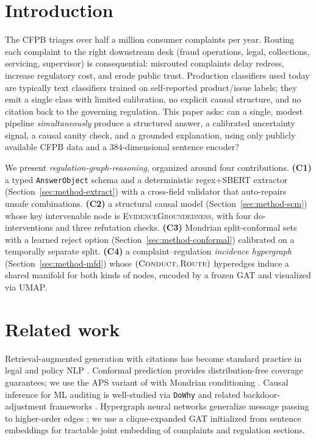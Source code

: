 \documentclass[11pt]{article}
\begin{document}
\section{Introduction}\label{sec:intro}

The CFPB triages over half a million consumer complaints per year. Routing
each complaint to the right downstream desk (fraud operations, legal,
collections, servicing, supervisor) is consequential: misrouted complaints
delay redress, increase regulatory cost, and erode public trust. Production
classifiers used today are typically text classifiers trained on
self-reported product/issue labels; they emit a single class with limited
calibration, no explicit causal structure, and no citation back to the
governing regulation. This paper asks: can a single, modest pipeline
\emph{simultaneously} produce a structured answer, a calibrated uncertainty
signal, a causal sanity check, and a grounded explanation, using only
publicly available CFPB data and a $384$-dimensional sentence encoder?

We present \emph{regulation-graph-reasoning}, organized around four
contributions. \textbf{(C1)} a typed \texttt{AnswerObject} schema and a
deterministic regex+SBERT extractor (Section~\ref{sec:method-extract}) with a
cross-field validator that auto-repairs unsafe combinations.
\textbf{(C2)} a structural causal model
(Section~\ref{sec:method-scm}) whose key intervenable node is
\textsc{EvidenceGroundedness}, with four do-interventions and three
refutation checks. \textbf{(C3)} Mondrian split-conformal sets with a
learned reject option (Section~\ref{sec:method-conformal}) calibrated on a
temporally separate split. \textbf{(C4)} a complaint--regulation
\emph{incidence hypergraph} (Section~\ref{sec:method-mfd}) whose
$(\textsc{Conduct}, \textsc{Route})$ hyperedges induce a shared manifold for
both kinds of nodes, encoded by a frozen GAT and visualized via UMAP.

\section{Related work}\label{sec:related}

Retrieval-augmented generation with citations has become standard practice
in legal and policy NLP \cite{lewis2020rag, gao2023retrieval}. Conformal
prediction provides distribution-free coverage guarantees; we use the APS
variant of \cite{romano2020aps} with Mondrian conditioning
\cite{vovk2003mondrian, angelopoulos2021gentle}. Causal inference for ML
auditing is well-studied via \texttt{DoWhy} \cite{sharma2020dowhy} and
related backdoor-adjustment frameworks \cite{pearl2009causality}. Hypergraph
neural networks generalize message passing to higher-order edges
\cite{feng2019hgnn, dong2020hnhn}; we use a clique-expanded GAT
\cite{velickovic2018gat} initialized from sentence embeddings
\cite{reimers2019sbert} for tractable joint embedding of complaints and
regulation sections.
\end{document}
